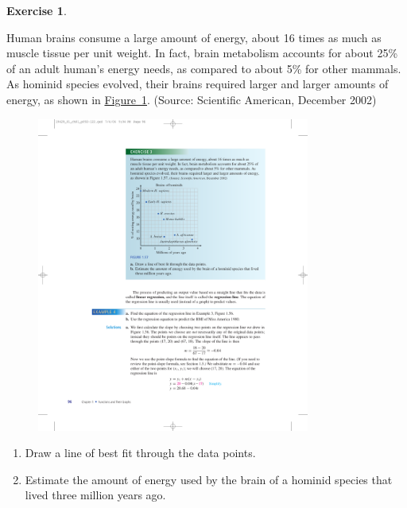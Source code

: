\documentclass[10pt,]{book}
\theoremstyle{plain}
\theoremstyle{definition}
\theoremstyle{definition}
\theoremstyle{definition}
\theoremstyle{definition}
\newtheorem{exercise}[theorem]{Exercise}
\numberwithin{equation}{section}
\begin{document}
\begin{exercise}\label{hominid-brains}

    Human brains consume a large amount of energy, about 16 times as much as muscle tissue per unit weight. In fact, brain metabolism accounts for about 25\% of an adult human’s energy needs, as compared to about 5\% for other mammals. As hominid species evolved, their brains required larger and larger amounts of energy, as shown in \hyperref[fig-hominid-brains]{Figure~\ref{fig-hominid-brains}}. (Source: Scientific American, December 2002)
\leavevmode%
\begin{figure}
\centering
\includegraphics[width=0.80\textwidth,]{images/fig-hominid-brains.pdf}\caption{\label{fig-hominid-brains}}
\end{figure}
\leavevmode%
\begin{enumerate}[label=*\alph**]
\item\hypertarget{li-201}{}Draw a line of best fit through the data points.\item\hypertarget{li-202}{}Estimate the amount of energy used by the brain of a hominid species that lived three million years ago.\end{enumerate}
\end{exercise}
\par
\end{document}
